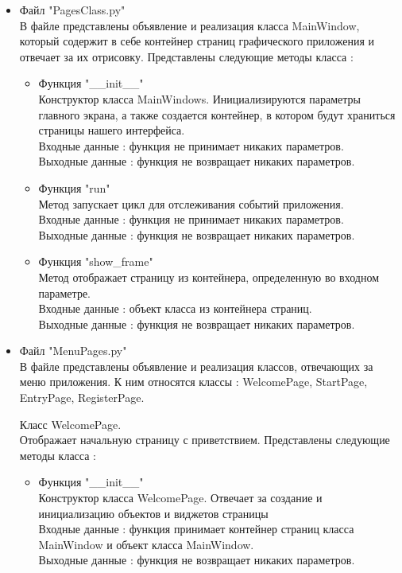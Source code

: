 \documentclass[a4document]{article}
\begin{document}
{\begin{itemize}
    \item Файл "PagesClass.py" \\ 
        В файле представлены объявление и реализация класса MainWindow, который содержит в себе контейнер страниц графического
        приложения и отвечает за их отрисовку.
        Представлены следующие методы класса : 
        \begin{itemize}
            \item Функция "\_\_init\_\_" \\
                Конструктор класса MainWindows. Инициализируются параметры главного экрана, а также создается контейнер,
                в котором будут храниться страницы нашего интерфейса. \\
                Входные данные : функция не принимает никаких параметров.\\
                Выходные данные : функция не возвращает никаких параметров.
            \item Функция "run" \\
                Метод запускает цикл для отслеживания событий приложения.\\
                Входные данные : функция не принимает никаких параметров.\\
                Выходные данные : функция не возвращает никаких параметров.
            \item Функция "show\_frame" \\
                Метод отображает страницу из контейнера, определенную во входном параметре.\\
                Входные данные : объект класса из контейнера страниц.\\
                Выходные данные : функция не возвращает никаких параметров.
        \end{itemize}
    \newpage
    \item Файл "MenuPages.py"\\
        В файле представлены объявление и реализация классов, отвечающих за меню приложения. 
        К ним относятся классы : WelcomePage, StartPage,\\ EntryPage, RegisterPage.
        \bigbreak
    
        Класс WelcomePage.\\
        Отображает начальную страницу с приветствием.
        Представлены следующие методы класса : 
        \begin{itemize}
            \item Функция "\_\_init\_\_" \\
                Конструктор класса WelcomePage. Отвечает за создание и инициализацию объектов и виджетов страницы \\
                Входные данные : функция принимает контейнер страниц класса \\MainWindow и объект класса MainWindow.\\
                Выходные данные : функция не возвращает никаких параметров.
        \end{itemize}
        \bigbreak
        

\end{itemize}}
\end{document}

